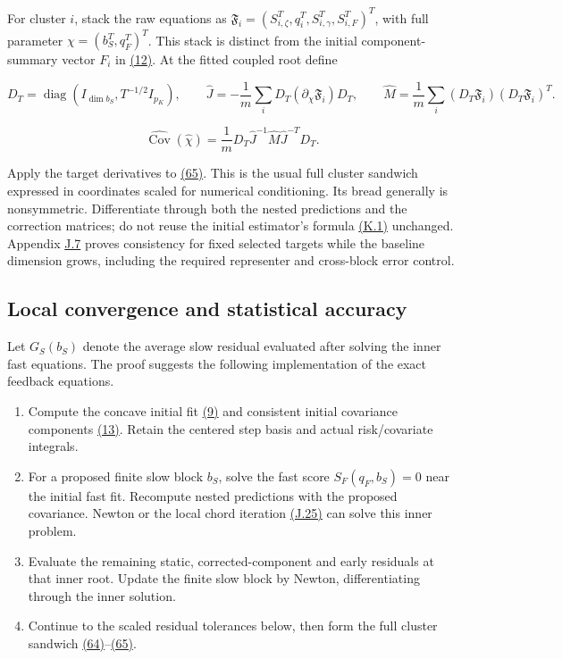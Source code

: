 \documentclass[11pt]{article}
\begin{document}
For cluster \(i\), stack the raw equations as
\(\mathfrak F_i=(S_{i,\zeta}^T,q_i^T,S_{i,\gamma}^T,S_{i,F}^T)^T\), with full parameter \(\chi=(b_S^T,q_F^T)^T\). This stack is distinct from the initial component-summary vector \(F_i\) in \hyperref[eq:12]{(12)}. At the fitted coupled root define

\begin{equation*}
D_T=\operatorname{diag}(I_{\dim b_S},T^{-1/2}I_{p_K}),\qquad
\widehat J=-\frac1m\sum_iD_T(\partial_\chi \mathfrak F_i)D_T,\qquad
\widehat M=\frac1m\sum_i(D_T\mathfrak F_i)(D_T\mathfrak F_i)^T.
\tag{64}\label{eq:64}
\end{equation*}

\begin{equation*}
\widehat{\operatorname{Cov}}(\widehat\chi)
 =\frac1mD_T\widehat J^{-1}\widehat M\widehat J^{-T}D_T.
\tag{65}\label{eq:65}
\end{equation*}

Apply the target derivatives to \hyperref[eq:65]{(65)}. This is the usual full cluster sandwich expressed in coordinates scaled for numerical conditioning. Its bread generally is nonsymmetric. Differentiate through both the nested predictions and the correction matrices; do not reuse the initial estimator's formula \hyperref[eq:K.1]{(K.1)} unchanged. Appendix \hyperref[sec:J.7]{J.7} proves consistency for fixed selected targets while the baseline dimension grows, including the required representer and cross-block error control.

\subsection{Local convergence and statistical accuracy}\label{sec:4.8}

Let \(G_S(b_S)\) denote the average slow residual evaluated after solving the inner fast equations. The proof suggests the following implementation of the exact feedback equations.

\begin{enumerate}
  \item Compute the concave initial fit \hyperref[eq:9]{(9)} and consistent initial covariance components \hyperref[eq:13]{(13)}. Retain the centered step basis and actual risk/covariate integrals.
  \item For a proposed finite slow block \(b_S\), solve the fast score \(S_F(q_F,b_S)=0\) near the initial fast fit. Recompute nested predictions with the proposed covariance. Newton or the local chord iteration \hyperref[eq:J.25]{(J.25)} can solve this inner problem.
  \item Evaluate the remaining static, corrected-component and early residuals at that inner root. Update the finite slow block by Newton, differentiating through the inner solution.
  \item Continue to the scaled residual tolerances below, then form the full cluster sandwich \hyperref[eq:64]{(64)}--\hyperref[eq:65]{(65)}.
\end{enumerate}
\end{document}
